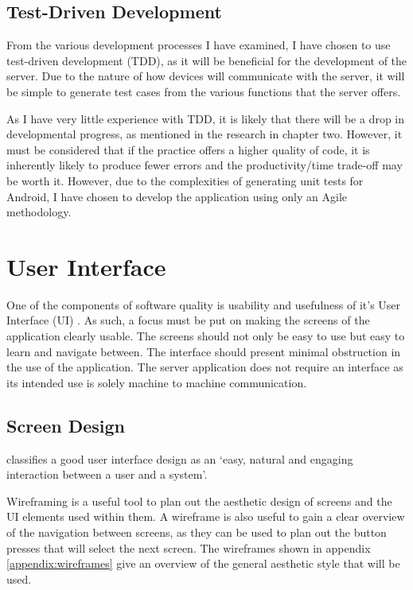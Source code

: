 \subsection{Test-Driven Development}
From the various development processes I have examined, I have chosen to use test-driven development (TDD), as it will be beneficial for the development of the server.
Due to the nature of how devices will communicate with the server, it will be simple to generate test cases from the various functions that the server offers.

As I have very little experience with TDD, it is likely that there will be a drop in developmental progress, as mentioned in the research in chapter two.
However, it must be considered that if the practice offers a higher quality of code, it is inherently likely to produce fewer errors and the productivity/time trade-off may be worth it.
However, due to the complexities of generating unit tests for Android, I have chosen to develop the application using only an Agile methodology.

\section{User Interface}
One of the components of software quality is usability and usefulness of it's User Interface (UI) \citep{isosoftwarequality}. 
As such, a focus must be put on making the screens of the application clearly usable.
The screens should not only be easy to use but easy to learn and navigate between. The interface should present minimal obstruction in the use of the application. 
The server application does not require an interface as its intended use is solely machine to machine communication.

\subsection{Screen Design}
\cite{stone2005user} classifies a good user interface design as an `easy, natural and engaging interaction between a user and a system'.

Wireframing is a useful tool to plan out the aesthetic design of screens and the UI elements used within them.
A wireframe is also useful to gain a clear overview of the navigation between screens, as they can be used to plan out the button presses that will select the next screen.
The wireframes shown in appendix \ref{appendix:wireframes} give an overview of the general aesthetic style that will be used.

